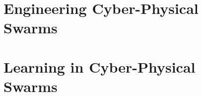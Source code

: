 \documentclass[12pt,a4paper,oneside]{book}
\begin{document}
\part{Engineering Cyber-Physical Swarms}\label{part:engineering}
\begin{refsection}


\printbibliography[title=References,heading=bibintoc]
\end{refsection}
\part{Learning in Cyber-Physical Swarms}\label{part:learning}
\begin{refsection}


\printbibliography[title=References,heading=bibintoc]
\end{refsection}


\adjustmtc

\end{document}
